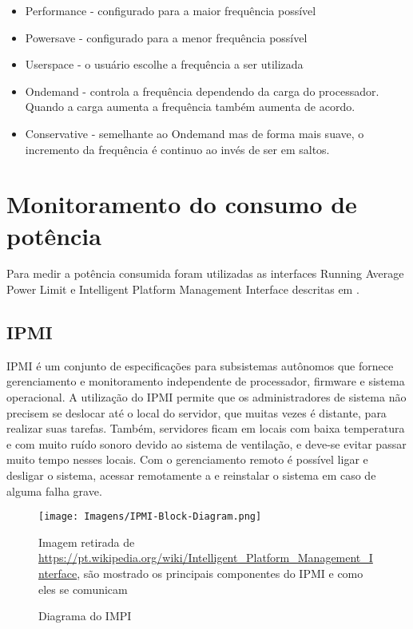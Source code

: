 \begin{itemize}
\item Performance - configurado para a maior frequência possível
\item Powersave - configurado para a menor frequência possível
\item Userspace - o usuário escolhe a frequência a ser utilizada 
\item Ondemand -  controla a frequência dependendo da carga do processador. Quando a carga aumenta a frequência também aumenta de acordo.
\item Conservative - semelhante ao Ondemand mas de forma mais suave, o incremento da frequência é continuo ao invés de ser em saltos.
\end{itemize}

\section{Monitoramento do consumo de potência} \label{sec:monitoramento}
Para medir a potência consumida foram utilizadas as interfaces Running Average Power Limit  e Intelligent Platform Management Interface  descritas em \cite{November2013}.

\subsection{IPMI}
IPMI \cite{November2013} é um conjunto de especificações para subsistemas autônomos que fornece gerenciamento e monitoramento independente de processador, firmware e sistema operacional. A utilização do IPMI permite que os administradores de sistema não precisem se deslocar até o local do servidor, que muitas vezes é distante, para realizar suas tarefas. Também, servidores ficam em locais com baixa temperatura e com muito ruído sonoro devido ao sistema de ventilação, e deve-se evitar passar muito tempo nesses locais. Com o gerenciamento remoto é possível ligar e desligar o sistema, acessar remotamente a  e reinstalar o sistema em caso de alguma falha grave.

\begin{figure}[H]
\centering
\texttt{[image: Imagens/IPMI-Block-Diagram.png]}
\caption{Diagrama do IMPI}{Imagem retirada de \protect\url{https://pt.wikipedia.org/wiki/Intelligent_Platform_Management_Interface}, são mostrado os principais componentes do IPMI e como eles se comunicam}
\label{fig:IPMI}
\end{figure}

